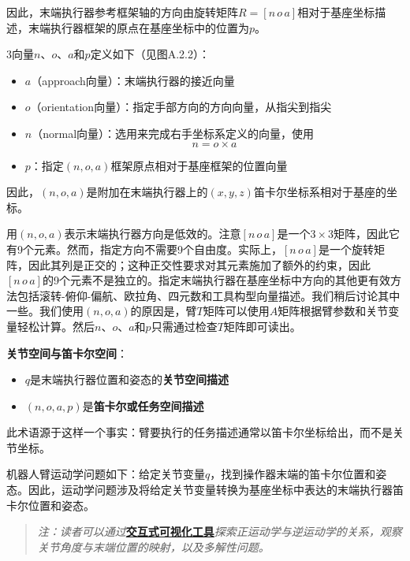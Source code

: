 \documentclass[UTF8,a4paper]{ctexart}
\begin{document}
因此，末端执行器参考框架轴的方向由旋转矩阵$R = [n \, o \, a]$相对于基座坐标描述，末端执行器框架的原点在基座坐标中的位置为$p$。

3向量$n$、$o$、$a$和$p$定义如下（见图A.2.2）：
\begin{itemize}
    \item $a$（approach向量）：末端执行器的接近向量
    \item $o$（orientation向量）：指定手部方向的方向向量，从指尖到指尖
    \item $n$（normal向量）：选用来完成右手坐标系定义的向量，使用
    \begin{equation}
    n = o \times a
    \tag{A.2.12}
    \end{equation}
    \item $p$：指定$(n, o, a)$框架原点相对于基座框架的位置向量
\end{itemize}

因此，$(n, o, a)$是附加在末端执行器上的$(x, y, z)$笛卡尔坐标系相对于基座的坐标。

用$(n, o, a)$表示末端执行器方向是低效的。注意$[n \, o \, a]$是一个$3\times 3$矩阵，因此它有9个元素。然而，指定方向不需要9个自由度。实际上，$[n \, o \, a]$是一个旋转矩阵，因此其列是正交的；这种正交性要求对其元素施加了额外的约束，因此$[n \, o \, a]$的9个元素不是独立的。指定末端执行器在基座坐标中方向的其他更有效方法包括滚转-俯仰-偏航、欧拉角、四元数和工具构型向量描述。我们稍后讨论其中一些。我们使用$(n, o, a)$的原因是，臂$T$矩阵可以使用$A$矩阵根据臂参数和关节变量轻松计算。然后$n$、$o$、$a$和$p$只需通过检查$T$矩阵即可读出。

\textbf{关节空间与笛卡尔空间}：
\begin{itemize}
    \item $q$是末端执行器位置和姿态的\textbf{关节空间描述}
    \item $(n, o, a, p)$是\textbf{笛卡尔或任务空间描述}
\end{itemize}

此术语源于这样一个事实：臂要执行的任务描述通常以笛卡尔坐标给出，而不是关节坐标。

机器人臂运动学问题如下：给定关节变量$q$，找到操作器末端的笛卡尔位置和姿态。因此，运动学问题涉及将给定关节变量转换为基座坐标中表达的末端执行器笛卡尔位置和姿态。

\begin{quote}
\textit{注：读者可以通过}\href{https://frankjie09.github.io/Robot-Manipulator-Control-CN/figures/Forward_Inverse_Kinematics.html}{\textbf{交互式可视化工具}}\textit{探索正运动学与逆运动学的关系，观察关节角度与末端位置的映射，以及多解性问题。}
\end{quote}
\end{document}
